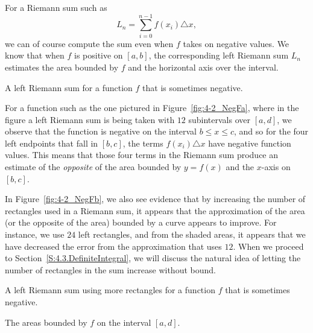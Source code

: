 For a Riemann sum such as 
$$L_n = \sum_{i=0}^{n-1} f(x_i) \triangle x,$$
we can of course compute the sum even when $f$ takes on negative values.  We know that when $f$ is positive on $[a,b]$, the corresponding left Riemann sum $L_n$ estimates the area bounded by $f$ and the horizontal axis over the interval.

\begin{marginfigure}[-5cm] %
\caption{A left Riemann sum for a function $f$ that is sometimes negative.} \label{fig:4-2_NegFa}
\end{marginfigure}

For a function such as the one pictured in Figure~\ref{fig:4-2_NegFa}, where in the figure a left Riemann sum is being taken with $12$ subintervals over $[a,d]$, we observe that the function is negative on the interval $b \le x \le c$, and so for the four left endpoints that fall in $[b,c]$, the terms $f(x_i) \triangle x$ have negative function values.  This means that those four terms in the Riemann sum produce an estimate of the \emph{opposite} of the area bounded by $y = f(x)$ and the $x$-axis on $[b,c]$.

In Figure~\ref{fig:4-2_NegFb}, we also see evidence that by increasing the number of rectangles used in a Riemann sum, it appears that the approximation of the area (or the opposite of the area) bounded by a curve appears to improve.  For instance,  we use $24$ left rectangles, and from the shaded areas, it appears that we have decreased the error from the approximation that uses $12$.  When we proceed to Section~\ref{S:4.3.DefiniteIntegral}, we will discuss the natural idea of letting the number of rectangles in the sum increase without bound.  

\begin{marginfigure}[-7cm] %
\caption{A left Riemann sum using more rectangles for a function $f$ that is sometimes negative.} \label{fig:4-2_NegFb}
\end{marginfigure}

\begin{marginfigure} %
\caption{The areas bounded by $f$ on the interval $[a,d]$.} \label{fig:4-2_NegFc}
\end{marginfigure}

